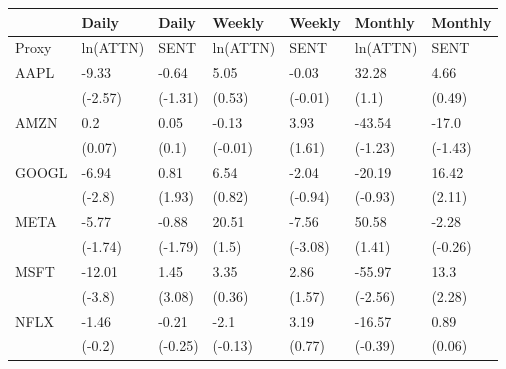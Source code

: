 \begin{tabular}{lllllll}
\toprule
{} &     Daily &    Daily &    Weekly &   Weekly &   Monthly &  Monthly \\
\midrule
Proxy &  ln(ATTN) &     SENT &  ln(ATTN) &     SENT &  ln(ATTN) &     SENT \\
AAPL  &     -9.33 &    -0.64 &      5.05 &    -0.03 &     32.28 &     4.66 \\
      &   (-2.57) &  (-1.31) &    (0.53) &  (-0.01) &     (1.1) &   (0.49) \\
AMZN  &       0.2 &     0.05 &     -0.13 &     3.93 &    -43.54 &    -17.0 \\
      &    (0.07) &    (0.1) &   (-0.01) &   (1.61) &   (-1.23) &  (-1.43) \\
GOOGL &     -6.94 &     0.81 &      6.54 &    -2.04 &    -20.19 &    16.42 \\
      &    (-2.8) &   (1.93) &    (0.82) &  (-0.94) &   (-0.93) &   (2.11) \\
META  &     -5.77 &    -0.88 &     20.51 &    -7.56 &     50.58 &    -2.28 \\
      &   (-1.74) &  (-1.79) &     (1.5) &  (-3.08) &    (1.41) &  (-0.26) \\
MSFT  &    -12.01 &     1.45 &      3.35 &     2.86 &    -55.97 &     13.3 \\
      &    (-3.8) &   (3.08) &    (0.36) &   (1.57) &   (-2.56) &   (2.28) \\
NFLX  &     -1.46 &    -0.21 &      -2.1 &     3.19 &    -16.57 &     0.89 \\
      &    (-0.2) &  (-0.25) &   (-0.13) &   (0.77) &   (-0.39) &   (0.06) \\
\bottomrule
\end{tabular}
